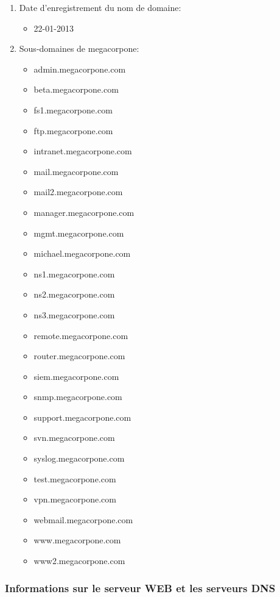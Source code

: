 \documentclass[french,paper=a4,oneside,captions=tableheading]{article}
\begin{document}
\begin{enumerate}
    \item Date d'enregistrement du nom de domaine:
    \begin{itemize}
        \item 22-01-2013
    \end{itemize}
    \item Sous-domaines de megacorpone:
    \begin{itemize}
        \item admin.megacorpone.com
        \item beta.megacorpone.com
        \item fs1.megacorpone.com
        \item ftp.megacorpone.com
        \item intranet.megacorpone.com
        \item mail.megacorpone.com
        \item mail2.megacorpone.com
        \item manager.megacorpone.com
        \item mgmt.megacorpone.com
        \item michael.megacorpone.com
        \item ns1.megacorpone.com
        \item ns2.megacorpone.com
        \item ns3.megacorpone.com
        \item remote.megacorpone.com
        \item router.megacorpone.com
        \item siem.megacorpone.com
        \item snmp.megacorpone.com
        \item support.megacorpone.com
        \item svn.megacorpone.com
        \item syslog.megacorpone.com
        \item test.megacorpone.com
        \item vpn.megacorpone.com
        \item webmail.megacorpone.com
        \item www.megacorpone.com
        \item www2.megacorpone.com
    \end{itemize}
\end{enumerate}



\subsubsection{Informations sur le serveur WEB et les serveurs DNS}
\end{document}
